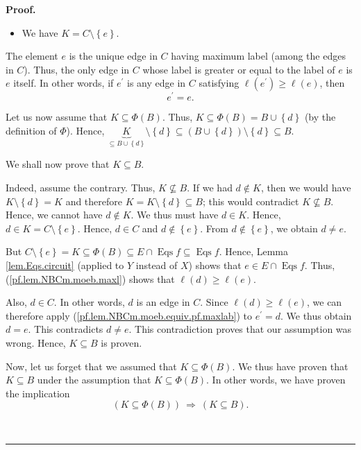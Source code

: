\documentclass[numbers=enddot,12pt,final,onecolumn,notitlepage]{scrartcl}%
\theoremstyle{definition}
\newenvironment{proof}[1][Proof]{\noindent\textbf{#1.} }{\ \rule{0.5em}{0.5em}}
\newenvironment{verlong}{}{}
\begin{document}
\begin{verlong}
\begin{proof}
\begin{itemize}
\item We have $K=C\setminus\left\{  e\right\}  $.
\end{itemize}

The element $e$ is the unique edge in $C$ having maximum label (among the
edges in $C$). Thus, the only edge in $C$ whose label is greater or equal to
the label of $e$ is $e$ itself. In other words, if $e^{\prime}$ is any edge in
$C$ satisfying $\ell\left(  e^{\prime}\right)  \geq\ell\left(  e\right)  $,
then%
\begin{equation}
e^{\prime}=e. \label{pf.lem.NBCm.moeb.equiv.pf.maxlab}%
\end{equation}


Let us now assume that $K\subseteq\Phi\left(  B\right)  $. Thus,
$K\subseteq\Phi\left(  B\right)  =B\cup\left\{  d\right\}  $ (by the
definition of $\Phi$). Hence, $\underbrace{K}_{\subseteq B\cup\left\{
d\right\}  }\setminus\left\{  d\right\}  \subseteq\left(  B\cup\left\{
d\right\}  \right)  \setminus\left\{  d\right\}  \subseteq B$.

We shall now prove that $K\subseteq B$.

Indeed, assume the contrary. Thus, $K\not \subseteq B$. If we had $d\notin K$,
then we would have $K\setminus\left\{  d\right\}  =K$ and therefore
$K=K\setminus\left\{  d\right\}  \subseteq B$; this would contradict
$K\not \subseteq B$. Hence, we cannot have $d\notin K$. We thus must have
$d\in K$. Hence, $d\in K=C\setminus\left\{  e\right\}  $. Hence, $d\in C$ and
$d\notin\left\{  e\right\}  $. From $d\notin\left\{  e\right\}  $, we obtain
$d\neq e$.

But $C\setminus\left\{  e\right\}  =K\subseteq\Phi\left(  B\right)  \subseteq
E\cap\operatorname*{Eqs}f\subseteq\operatorname*{Eqs}f$. Hence, Lemma
\ref{lem.Eqs.circuit} (applied to $Y$ instead of $X$) shows that $e\in
E\cap\operatorname*{Eqs}f$. Thus, (\ref{pf.lem.NBCm.moeb.maxl}) shows that
$\ell\left(  d\right)  \geq\ell\left(  e\right)  $.

Also, $d\in C$. In other words, $d$ is an edge in $C$. Since $\ell\left(
d\right)  \geq\ell\left(  e\right)  $, we can therefore apply
(\ref{pf.lem.NBCm.moeb.equiv.pf.maxlab}) to $e^{\prime}=d$. We thus obtain
$d=e$. This contradicts $d\neq e$. This contradiction proves that our
assumption was wrong. Hence, $K\subseteq B$ is proven.

Now, let us forget that we assumed that $K\subseteq\Phi\left(  B\right)  $. We
thus have proven that $K\subseteq B$ under the assumption that $K\subseteq
\Phi\left(  B\right)  $. In other words, we have proven the implication%
\begin{equation}
\left(  K\subseteq\Phi\left(  B\right)  \right)  \ \Longrightarrow\ \left(
K\subseteq B\right)  . \label{pf.lem.NBCm.moeb.equiv.pf.dir1}%
\end{equation}



\end{proof}
\end{verlong}
\end{document}
